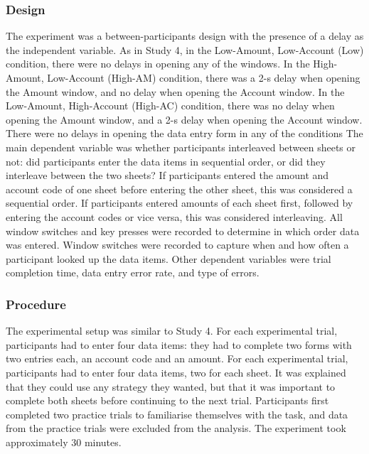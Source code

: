 \subsubsection{Design}
The experiment was a between-participants design with the presence of a delay as the independent variable. 
As in Study 4, in the Low-Amount, Low-Account (Low) condition, there were no delays in opening any of the windows. In the High-Amount, Low-Account (High-AM) condition, there was a 2-s delay when opening the Amount window, and no delay when opening the Account window. In the Low-Amount, High-Account (High-AC) condition, there was no delay when opening the Amount window, and a 2-s delay when opening the Account window. There were no delays in opening the data entry form in any of the conditions 
The main dependent variable was whether participants interleaved between sheets or not: did participants enter the data items in sequential order, or did they interleave between the two sheets? If participants entered the amount and account code of one sheet before entering the other sheet, this was considered a sequential order. If participants entered amounts of each sheet first, followed by entering the account codes or vice versa, this was considered interleaving. All window switches and key presses were recorded to determine in which order data was entered. Window switches were recorded to capture when and how often a participant looked up the data items. Other dependent variables were trial completion time, data entry error rate, and type of errors.


\subsubsection{Procedure}
The experimental setup was similar to Study 4. For each experimental trial, participants had to enter four data items: they had to complete two forms with two entries each, an account code and an amount. For each experimental trial, participants had to enter four data items, two for each sheet. It was explained that they could use any strategy they wanted, but that it was important to complete both sheets before continuing to the next trial. Participants first completed two practice trials to familiarise themselves with the task, and data from the practice trials were excluded from the analysis. The experiment took approximately 30 minutes.

